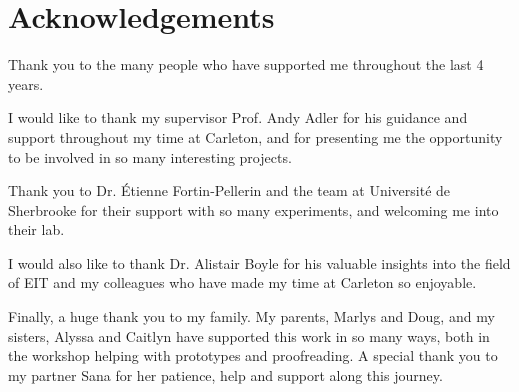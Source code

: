 \thispagestyle{plain}

\section*{Acknowledgements}

Thank you to the many people who have supported me throughout the last 4 years.

\vspace{5mm}

\noindent I would like to thank my supervisor Prof. Andy Adler for his 
guidance and support throughout my time at Carleton, and for presenting
me the opportunity to be involved in so many interesting projects. 

\vspace{5mm}

\noindent Thank you to Dr. \'Etienne Fortin-Pellerin and the team at Universit\'e de Sherbrooke for their 
support with so many experiments, and welcoming me into their lab.

\vspace{5mm}

\noindent I would also like to thank 
Dr. Alistair Boyle for his valuable insights into the field 
of EIT and my colleagues who have made my time at 
Carleton so enjoyable. 

\vspace{5mm}

\noindent Finally, a huge thank you to my family. 
My parents, Marlys and Doug, and my sisters, Alyssa and Caitlyn 
have supported this work in so many ways, both in the workshop helping 
with prototypes and proofreading. A special thank you to my partner Sana for 
her patience, help and support along this journey.


